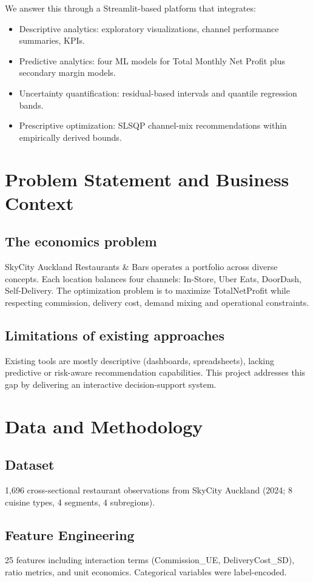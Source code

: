 \documentclass[11pt,a4paper]{article}
\begin{document}
We answer this through a Streamlit-based platform that integrates:
\begin{itemize}
  \item Descriptive analytics: exploratory visualizations, channel performance summaries, KPIs.
  \item Predictive analytics: four ML models for Total Monthly Net Profit plus secondary margin models.
  \item Uncertainty quantification: residual-based intervals and quantile regression bands.
  \item Prescriptive optimization: SLSQP channel-mix recommendations within empirically derived bounds.
\end{itemize}

\section{Problem Statement and Business Context}
\subsection{The economics problem}
SkyCity Auckland Restaurants & Bars operates a portfolio across diverse concepts. Each location balances four channels: In-Store, Uber Eats, DoorDash, Self-Delivery. The optimization problem is to maximize TotalNetProfit while respecting commission, delivery cost, demand mixing and operational constraints.

\subsection{Limitations of existing approaches}
Existing tools are mostly descriptive (dashboards, spreadsheets), lacking predictive or risk-aware recommendation capabilities. This project addresses this gap by delivering an interactive decision-support system.

\section{Data and Methodology}
\subsection{Dataset}
1,696 cross-sectional restaurant observations from SkyCity Auckland (2024; 8 cuisine types, 4 segments, 4 subregions).

\subsection{Feature Engineering}
25 features including interaction terms (Commission\_UE, DeliveryCost\_SD), ratio metrics, and unit economics. Categorical variables were label-encoded.
\end{document}
